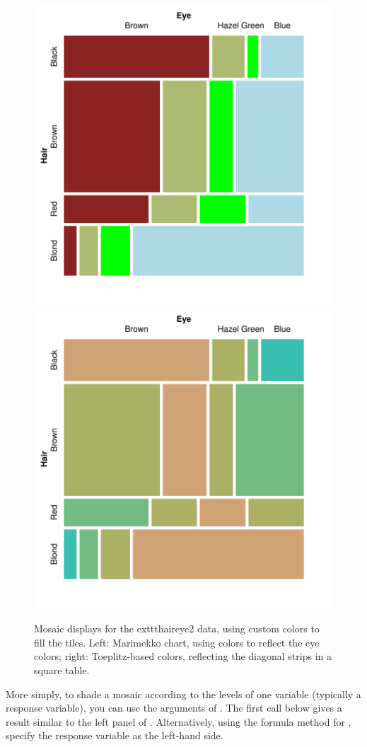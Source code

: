 \documentclass[10pt,krantz2]{krantz}\usepackage[]{graphicx}\usepackage[]{color}
\newenvironment{knitrout}{}{} %
\renewenvironment{knitrout}{\small\renewcommand{\baselinestretch}{.85}}{} %
\begin{document}
\begin{knitrout}
\begin{figure}[!htbp]
\centerline{\includegraphics[width=.49\textwidth]{ch05/fig/HE-fill-1} 
\includegraphics[width=.49\textwidth]{ch05/fig/HE-fill-2} }

\caption[Mosaic displays for the 	exttt{haireye2} data, using custom colors to fill the tiles]{Mosaic displays for the 	exttt{haireye2} data, using custom colors to fill the tiles. Left: Marimekko chart, using colors to reflect the eye colors; right: Toeplitz-based colors, reflecting the diagonal strips in a square table.}\label{fig:HE-fill}
\end{figure}


\end{knitrout}


More simply, to shade a mosaic according to the levels of one variable (typically a response variable),
you can use the  arguments of .
The first call below gives a result similar to the left panel of .
Alternatively, using the formula method for , specify the response
variable as the left-hand side.
\end{document}

